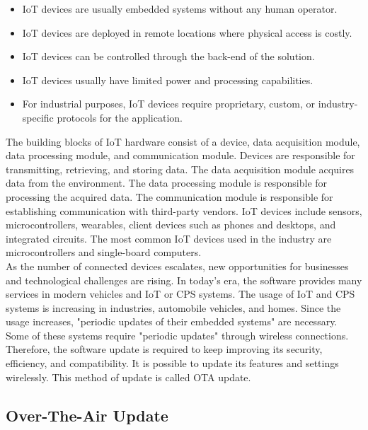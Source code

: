 \documentclass[12pt,a4paper]{article}
\begin{document}
\begin{itemize}

\item IoT devices are usually embedded systems without any human operator. \cite{r36}
\item IoT devices are deployed in remote locations where physical access is costly. \cite{r36}
\item IoT devices can be controlled through the back-end of the solution. \cite{r36}
\item IoT devices usually have limited power and processing capabilities. \cite{r36}
\item For industrial purposes, IoT devices require proprietary, custom, or industry-specific protocols for the application. \cite{r36}

\end{itemize}

The building blocks of IoT hardware consist of a device, data acquisition module, data processing module, and communication module. Devices are responsible for transmitting, retrieving, and storing data. The data acquisition module acquires data from the environment. The data processing module is responsible for processing the acquired data. The communication module is responsible for establishing communication with third-party vendors. IoT devices include sensors, microcontrollers, wearables, client devices such as phones and desktops, and integrated circuits. The most common IoT devices used in the industry are microcontrollers and single-board computers. \cite{r44} \\

As the number of connected devices escalates, new opportunities for businesses and technological challenges are rising. In today's era, the software provides many services in modern vehicles and IoT or CPS systems. \cite{r1} The usage of IoT and CPS systems is increasing in industries, automobile vehicles, and homes. Since the usage increases, "periodic updates of their embedded systems" are necessary. Some of these systems require "periodic updates" through wireless connections. \cite{r13} Therefore, the software update is required to keep improving its security, efficiency, and compatibility. It is possible to update its features and settings wirelessly. This method of update is called OTA update. \cite{r1}

\subsection{Over-The-Air Update}
\end{document}
